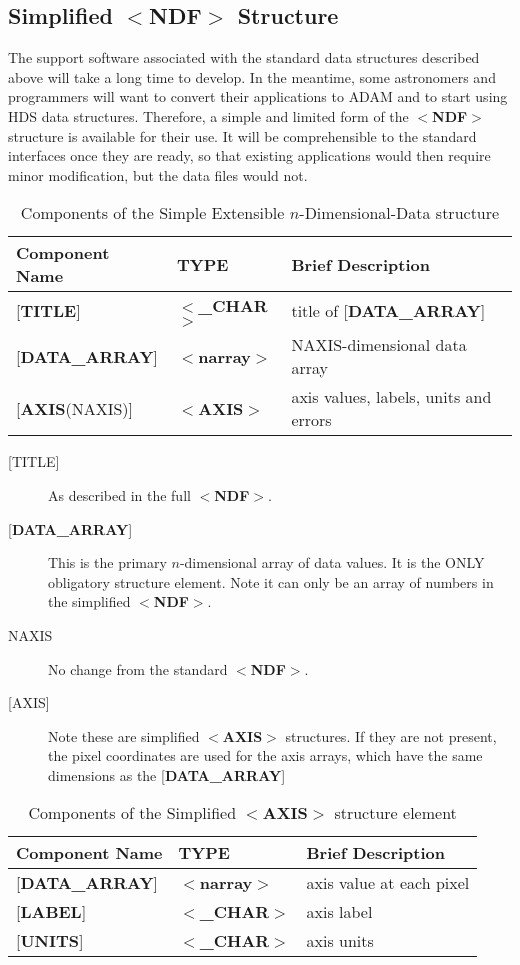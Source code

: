 \subsection{Simplified $<${\bf NDF}$>$ Structure\label{se:sndf}}

The support software associated with the
standard data structures described above
will take a long time to develop. In the meantime, some astronomers
and programmers will want to convert their applications to {\small ADAM} and
to start using HDS data structures.  Therefore, a simple and limited
form of the $<${\bf NDF}$>$ structure is available for their use.  It will be
comprehensible to the standard interfaces once they are ready, so
that existing
applications would then require minor modification, but the data files would
not.

\begin{table}[htb]
\centering
\caption{Components of the Simple Extensible $n$-Dimensional-Data structure}
\begin{tabular}{|l|l|l|}
\hline
Component Name & TYPE & Brief Description \\ \hline
{[}{\bf TITLE}{]} & $<${\bf \_CHAR}$>$ & title of {[}{\bf DATA\_ARRAY}{]} \\
{[}{\bf DATA\_ARRAY}{]} & $<${\bf narray}$>$ & NAXIS-dimensional data array \\
{[}{\bf AXIS}(NAXIS){]} & $<${\bf AXIS}$>$ & axis values, labels, units and errors \\ \hline
\end{tabular}
\end{table}

\begin{description}
\item [{[}TITLE{]}]  As described in the full $<${\bf NDF}$>$.
\item [{[}{\bf DATA\_ARRAY}{]}]  This is the primary
$n$-dimensional array of data values.
It is the ONLY obligatory structure element.  Note it can only be an array
of numbers in the simplified $<${\bf NDF}$>$.
\item [NAXIS]  No change from the standard $<${\bf NDF}$>$.
\item [{[}AXIS{]}] Note these are simplified $<${\bf AXIS}$>$ structures.
If they are not present, the pixel coordinates are used for the
axis arrays, which have the 
same dimensions as the {[}{\bf DATA\_ARRAY}{]}
\end{description}

\begin{table}[htb]
\centering
\caption{Components of the Simplified $<${\bf AXIS}$>$ structure element}
\begin{tabular}{|l|l|l|}
\hline
Component Name & TYPE & Brief Description \\ \hline
{[}{\bf DATA\_ARRAY}{]} & $<${\bf narray}$>$ & axis value at each pixel \\
{[}{\bf LABEL}{]} & $<${\bf \_CHAR}$>$ & axis label \\
{[}{\bf UNITS}{]} & $<${\bf \_CHAR}$>$ & axis units \\ \hline
\end{tabular}
\end{table}


